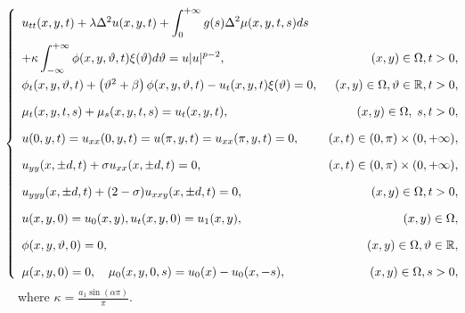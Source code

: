 \documentclass[12pt]{article}
\numberwithin{equation}{section}
\begin{document}
\begin{equation} \label{eq2.5}
\hspace{-0.4cm}\left\{\begin{array}{lr}
u_{t t}(x, y, t)+\lambda\Delta^{2} u(x, y, t)+ \displaystyle\int_{0}^{+\infty} g(s) \Delta^2 \mu (x,y,t,s) ds \\[1em]
+\kappa \displaystyle\int_{-\infty}^{+\infty} \phi(x, y, \vartheta, t) \xi(\vartheta) d \vartheta=u|u|^{p-2},  & (x, y) \in \Omega, t>0, \\[1em]
 \phi_{t}(x, y, \vartheta, t)+\left(\vartheta^{2}+\beta\right) \phi(x, y, \vartheta, t)-u_t (x,y,t) \xi(\vartheta)=0, & (x, y) \in \Omega, \vartheta \in \mathbb{R}, t>0, \\[1em]
\mu_t (x,y,t,s) + \mu_s(x,y,t,s)=u_t(x,y,t),& (x, y) \in \Omega,\; s, t>0, \\[1em]
u(0, y, t)=u_{x x}(0, y, t)=u(\pi, y, t)=u_{x x}(\pi, y, t)=0, & (x, t) \in(0, \pi) \times(0,+\infty), \\[1em]
u_{y y}(x, \pm d, t)+\sigma u_{x x}(x, \pm d, t)=0, & (x, t) \in(0, \pi) \times(0,+\infty), \\[1em]
u_{y y y}(x, \pm d, t)+(2-\sigma) u_{x x y}(x, \pm d, t)=0, & (x, y) \in \Omega, t>0, \\[1em]
u(x, y, 0)=u_{0}(x, y), u_{t}(x, y, 0)=u_{1}(x, y), & (x, y) \in \Omega, \\[1em]
\phi(x, y, \vartheta, 0)=0, & (x, y) \in \Omega, \vartheta \in \mathbb{R}, \\[1em]
\mu(x,y,0) = 0, \quad \mu_0 (x,y,0,s) = u_0 (x) - u_0 (x,-s),   & (x, y) \in \Omega, s>0,
\end{array}\right.
\end{equation}
where $\kappa=\frac{a_{1} \sin (\alpha \pi)}{\pi}$.
\end{document}
